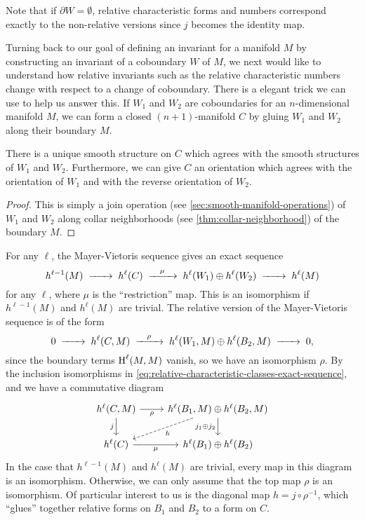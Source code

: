 \begin{remark}
	Note that if $\partial W=\emptyset$, relative characteristic forms and numbers correspond exactly to the non-relative versions since $j$ becomes the identity map.
\end{remark}

Turning back to our goal of defining an invariant for a manifold $M$ by constructing an invariant of a coboundary $W$ of $M$, we next would like to understand how relative invariants such as the relative characteristic numbers change with respect to a change of coboundary.
There is a elegant trick we can use to help us answer this. If $W_1$ and $W_2$ are coboundaries for an $n$-dimensional manifold $M$, we can form a closed $(n+1)$-manifold $C$ by gluing $W_1$ and $W_2$ along their boundary $M$.

\begin{proposition}
	There is a unique smooth structure on $C$ which agrees with the smooth structures of $W_1$ and $W_2$. Furthermore, we can give $C$ an orientation which agrees with the orientation of $W_1$ and with the reverse orientation of $W_2$.
\end{proposition}
\begin{proof}
	This is simply a join operation (see \cref{sec:smooth-manifold-operations}) of $W_1$ and $W_2$ along collar neighborhoods (see \cref{thm:collar-neighborhood}) of the boundary $M$.
\end{proof}

For any $\ell$, the Mayer-Vietoris sequence gives an exact sequence
\[
	h^{\ell-1}(M)\lkxto h^{\ell}(C) \lkxto[\mu] h^{\ell}(W_1)\oplus h^{\ell}(W_2) \lkxto h^{\ell}(M)
\]
for any $\ell$, where $\mu$ is the ``restriction'' map. This is an isomorphism if $h^{\ell-1}(M)$ and $h^\ell(M)$ are trivial.
The relative version of the Mayer-Vietoris sequence is of the form
\[
	0 \lkxto h^{\ell}(C, M) \lkxto[\rho] h^{\ell}(W_1,M)\oplus h^{\ell}(B_2,M) \lkxto 0,
\]
since the boundary terms $\operatorname{H}^\ell(M,M)$ vanish, so we have an isomorphism $\rho$.
By the inclusion isomorphisms in \cref{eq:relative-characteristic-classes-exact-sequence}, and we have a commutative diagram
\begin{equation}\label{eq:closing_coboundaries_square}
	\begin{tikzcd}
		{h^{\ell}(C,M)} & {h^{\ell}(B_1,M)\oplus h^{\ell}(B_2,M)} \\
		{h^{\ell}(C)} & {h^{\ell}(B_1)\oplus h^{\ell}(B_2)}
		\arrow["j_1\oplus j_2"', from=1-2, to=2-2]
		\arrow["\rho"', from=1-1, to=1-2]
		\arrow["j"', from=1-1, to=2-1]
		\arrow["\mu"', from=2-1, to=2-2]
		\arrow["h", from=1-2, to=2-1, dashed]
	\end{tikzcd}
\end{equation}
In the case that $h^{\ell-1}(M)$ and $h^\ell(M)$ are trivial, every map in this diagram is an isomorphism. Otherwise, we can only assume that the top map $\rho$ is an isomorphism.
Of particular interest to us is the diagonal map $h = j\circ \rho^{-1}$, which ``glues'' together relative forms on $B_1$ and $B_2$ to a form on $C$.

